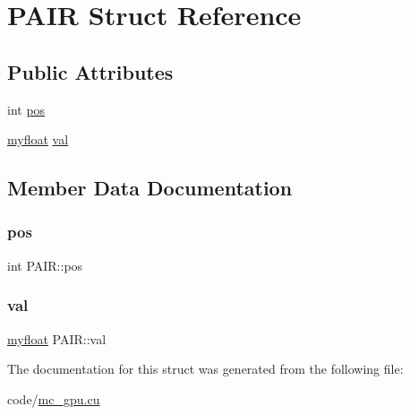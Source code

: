 \hypertarget{structPAIR}{}\section{P\+A\+IR Struct Reference}
\label{structPAIR}
\subsection*{Public Attributes}
\begin{DoxyCompactItemize}
\item 
int \hyperlink{structPAIR_aaa7d0d7e07c0fbbcc33e3fe27aadd1c3}{pos}
\item 
\hyperlink{param_8h_a5f097c9f3873af7be7fc156e6a06ca5e}{myfloat} \hyperlink{structPAIR_a0b1c8b7c4bbb3ee565e662e83e6b1d8b}{val}
\end{DoxyCompactItemize}


\subsection{Member Data Documentation}
\mbox{\label{structPAIR_aaa7d0d7e07c0fbbcc33e3fe27aadd1c3}} 
\subsubsection{\texorpdfstring{pos}{pos}}
{\footnotesize\ttfamily int P\+A\+I\+R\+::pos}

\mbox{\label{structPAIR_a0b1c8b7c4bbb3ee565e662e83e6b1d8b}} 
\subsubsection{\texorpdfstring{val}{val}}
{\footnotesize\ttfamily \hyperlink{param_8h_a5f097c9f3873af7be7fc156e6a06ca5e}{myfloat} P\+A\+I\+R\+::val}



The documentation for this struct was generated from the following file\+:\begin{DoxyCompactItemize}
\item 
code/\hyperlink{mc__gpu_8cu}{mc\+\_\+gpu.\+cu}\end{DoxyCompactItemize}
